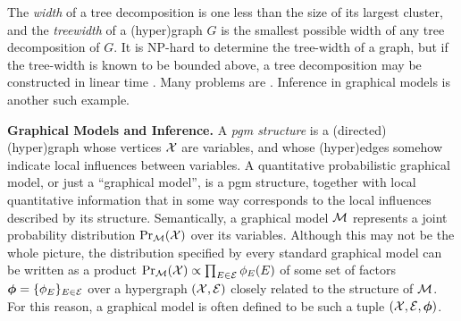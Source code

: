\documentclass[twoside]{article}
\begin{document}
The \emph{width} of a tree decomposition is one less than the size of its largest cluster,
and the \emph{treewidth} of a (hyper)graph $G$ is the smallest possible width of any tree decomposition of $G$.
It is NP-hard to determine the tree-width of a graph, but if the tree-width is known to be bounded above, a tree decomposition may be constructed in linear time \parencite{bodlaender1993linear}.
Many problems are \parencite{courcelle1990}.
Inference in graphical models is another such example. 


\textbf{Graphical Models and Inference.}
A \emph{pgm structure} is a (directed) (hyper)graph whose vertices $\mathcal X$ are variables, and whose (hyper)edges somehow indicate local influences between variables. 
A {quantitative} probabilistic graphical model, or just a ``graphical model'', is a pgm structure, together with local quantitative information that in some way corresponds to the local influences described by its structure.
%
Semantically,
a graphical model $\cal M$
represents a joint probability distribution $\Pr_{\cal M}(\mathcal X)$ over its variables. 
Although this may not be the whole picture, the distribution 
specified by every standard graphical model can be written as a product
% 
$\Pr_{\cal M}(\mathcal X) \propto \prod_{E \in \mathcal E} \phi_{E}(E)$
of some set of factors
$\boldsymbol\phi = \{ \phi_E \}_{E \in \mathcal E}$
over a hypergraph $(\mathcal X, \mathcal E)$ closely related to the structure of $\cal M$.
For this reason, a graphical model is often defined to be such a tuple
$(\mathcal X ,\mathcal E, \boldsymbol\phi)$. 
\end{document}

